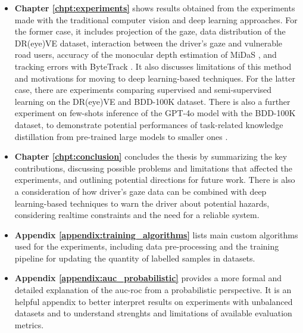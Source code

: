 \begin{itemize}
    \item \textbf{Chapter \ref{chpt:experiments}} shows results obtained from 
    the experiments made with the traditional computer vision and deep learning 
    approaches. For the former case, it includes projection of the gaze, 
    data distribution of the DR(eye)VE dataset, interaction between the 
    driver's gaze and vulnerable road users, accuracy of the monocular depth 
    estimation of MiDaS \cite{midas}, and tracking errors with ByteTrack \cite{bytetrack}. 
    It also discusses limitations of this method 
    and motivations for moving to deep learning-based techniques.
    For the latter case, there are experiments comparing supervised and 
    semi-supervised learning on the DR(eye)VE and BDD-100K dataset. There is also 
    a further experiment on few-shots inference of the GPT-4o model with the 
    BDD-100K dataset, to demonstrate potential performances of task-related 
    knowledge distillation from pre-trained large models to smaller ones
    \cite{yu_knowledge_distillation}.

    \item \textbf{Chapter \ref{chpt:conclusion}} concludes the thesis by summarizing 
    the key contributions, discussing possible problems and limitations that 
    affected the experiments, and outlining potential directions for future work.
    There is also a consideration of how driver's gaze data can be combined with 
    deep learning-based techniques to warn the driver about potential hazards, 
    considering realtime constraints and the need for a reliable system.
    \item \textbf{Appendix \ref{appendix:training_algorithms}} lists main custom 
    algorithms used for the experiments, including data pre-processing and the 
    training pipeline for updating the quantity of labelled samples in datasets.
    \item \textbf{Appendix \ref{appendix:auc_probabilistic}} provides a more 
    formal and detailed explanation of the \acs{auc}-\acs{roc} from a probabilistic
    perspective. It is an helpful appendix to better interpret results on 
    experiments with unbalanced datasets and to understand strenghts and 
    limitations of available evaluation metrics.
\end{itemize}
